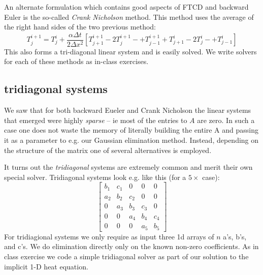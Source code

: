 \documentclass[11pt]{article}
\begin{document}
An alternate formulation which contains good aspects of FTCD and backward Euler is the so-called {\em Crank
Nicholson} method. This method uses the average of the right hand sides of the two previous method:
\begin{equation}
\label{Crank}
T^{i+1}_j = T^i_j + \frac{\alpha \Delta t}{2 \Delta x^2}
                                          \left[T^{i+1}_{j+1} - 2 T^{i+1}_j -+T^{i+1}_{j-1}  + 
                                                T^{i}_{j+1} - 2 T^{i}_j -+T^{i}_{j-1} \right]
\end{equation}
This also forms a tri-diagonal linear system and is easily solved. We write solvers for each of these methods
as in-class exercises.
\subsection{tridiagonal systems}
We saw that for both backward Eueler and Crank Nicholson the linear systems that emerged were highly {\em sparse} -- ie most
of the entries to $A$ are zero. In such a case one does not waste the memory of literally building the entire A and passing it
as a parameter to e.g. our Gaussian elimination method. Instead, depending on the structure of the matrix one of several
alternatives is employed.

It turns out the {\em tridiagonal} systems are extremely common and merit their own special solver. Tridiagonal systems
look e.g. like this (for a $5\times$ case):
$$
\left[
\begin{array}{ccccc}
b_1 & c_1 & 0 & 0 & 0 \\
a_2 & b_2 & c_2 & 0 & 0 \\
0 & a_3 & b_3 & c_3 & 0  \\
0 & 0 & a_4 & b_4 & c_4  \\
0 & 0 & 0 & a_5 & b_5 
\end{array}
\right]
$$
For tridiagional systems we only require as input three 1d arrays of $n$ a's, b's, and c's. We do
elimination directly only on the known non-zero coefficients. As in class exercise we code a simple
tridiagonal solver as part of our solution to the implicit 1-D heat equation.
\end{document}
